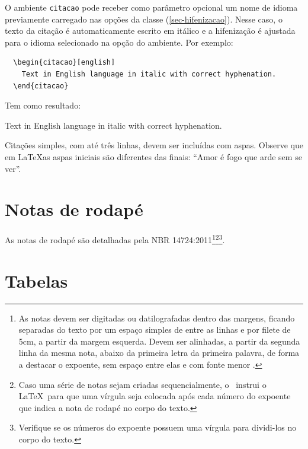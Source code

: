 \documentclass[article,12pt,oneside,a4paper,chapter=TITLE,english,brazil]{abntex2}
\begin{document}
\begin{anexosenv}
O ambiente \texttt{citacao} pode receber como parâmetro opcional um nome de idioma previamente carregado nas opções da classe (\autoref{sec-hifenizacao}). Nesse caso, o texto da citação é automaticamente escrito em itálico e a hifenização é ajustada para o idioma selecionado na opção do ambiente. Por exemplo:
\begin{verbatim}
  \begin{citacao}[english]
    Text in English language in italic with correct hyphenation.
  \end{citacao}
\end{verbatim}

Tem como resultado:
\begin{citacao}[english]
 Text in English language in italic with correct hyphenation.
\end{citacao}

Citações simples, com até três linhas, devem ser incluídas com aspas. Observe que em \LaTeX as aspas iniciais são diferentes das finais: ``Amor é fogo que arde sem se ver''.

\section{Notas de rodapé}

As notas de rodapé são detalhadas pela NBR 14724:2011\footnote{As notas devem ser digitadas ou datilografadas dentro das margens, ficando separadas do texto por um espaço simples de entre as linhas e por filete de 5cm, a partir da margem esquerda. Devem ser alinhadas, a partir da segunda linha da mesma nota, abaixo da primeira letra da primeira palavra, de forma a destacar o expoente, sem espaço entre elas e com fonte menor .}\footnote{Caso uma série de notas sejam criadas sequencialmente, o \abnTeX\ instrui o \LaTeX\ para que uma vírgula seja colocada após cada número do expoente que indica a nota de rodapé no corpo do texto.}\footnote{Verifique se os números do expoente possuem uma vírgula para dividi-los no corpo do texto.}. 


\section{Tabelas}


\end{anexosenv}
\end{document}
